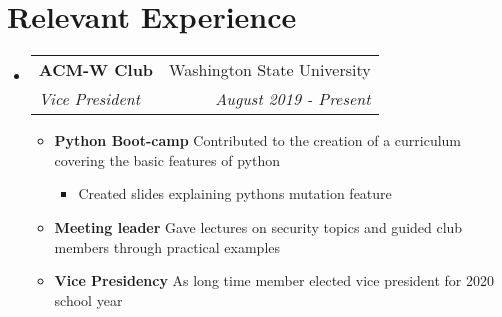 \documentclass[letterpaper,11pt]{article}
\makeatletter
\newcommand{\resumeItem}[2]{
  \item\small{
    \textbf{#1}{ #2 \vspace{-2pt}}
  }
}
\newcommand{\resumeSubheading}[4]{
  \vspace{-1pt}\item
    \begin{tabular*}{0.97\textwidth}[t]{l@{\extracolsep{\fill}}r}
      \textbf{#1} & #2 \\
      \textit{\small#3} & \textit{\small #4} \\
    \end{tabular*}\vspace{-5pt}
}
\newcommand{\resumeSubSubheading}[2]{
    \begin{tabular*}{0.97\textwidth}{l@{\extracolsep{\fill}}r}
      \textit{\small#1} & \textit{\small #2} \\
    \end{tabular*}\vspace{-5pt}
}
\newcommand{\resumeSubHeadingListStart}{\begin{itemize}[leftmargin=*]}
\newcommand{\resumeSubHeadingListEnd}{\end{itemize}}
\newcommand{\resumeItemListStart}{\begin{itemize}}
\newcommand{\resumeItemListEnd}{\end{itemize}\vspace{-5pt}}
\makeatother
\begin{document}
\section{\Large{\textbf{Relevant Experience}}}
  \resumeSubHeadingListStart
    \resumeSubheading
      {ACM-W Club}{Washington State University}
      {Vice President}{August 2019 - Present}
      \resumeItemListStart
      \resumeItem{Python Boot-camp}
        {Contributed to the creation of a curriculum covering the basic features of python}
        \resumeItemListStart
        \resumeItem{}{Created slides explaining pythons mutation feature}
        \resumeSubHeadingListEnd
      \resumeItem{Meeting leader}{Gave lectures on security topics and guided club members through practical examples}
      \resumeItem{Vice Presidency}{As long time member elected vice president for 2020 school year}  
      \resumeItemListEnd
  \resumeSubHeadingListEnd

%     
\end{document}
